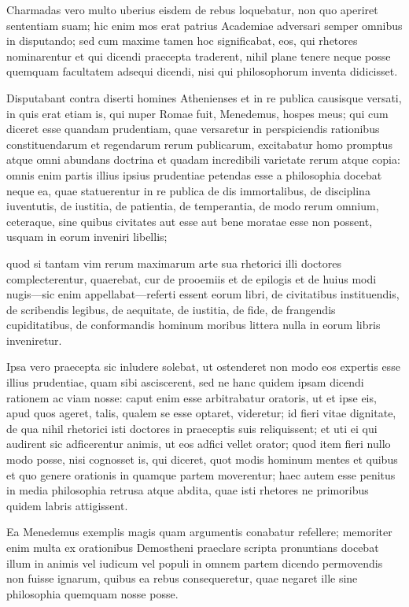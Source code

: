  Charmadas vero multo uberius eisdem de rebus loquebatur, non quo aperiret sententiam suam; hic enim mos erat patrius Academiae adversari semper omnibus in disputando; sed cum maxime tamen hoc significabat, eos, qui rhetores nominarentur et qui dicendi praecepta traderent, nihil plane tenere neque posse quemquam facultatem adsequi dicendi, nisi qui philosophorum inventa didicisset.

 Disputabant contra diserti homines Athenienses et in re publica causisque versati, in quis erat etiam is, qui nuper Romae fuit, Menedemus, hospes meus; qui cum diceret esse quandam prudentiam, quae versaretur in perspiciendis rationibus constituendarum et regendarum rerum publicarum, excitabatur homo promptus atque omni abundans doctrina et quadam incredibili varietate rerum atque copia: omnis enim partis illius ipsius prudentiae petendas esse a philosophia docebat neque ea, quae statuerentur in re publica de dis immortalibus, de disciplina iuventutis, de iustitia, de patientia, de temperantia, de modo rerum omnium, ceteraque, sine quibus civitates aut esse aut bene moratae esse non possent, usquam in eorum inveniri libellis;

 quod si tantam vim rerum maximarum arte sua rhetorici illi doctores complecterentur, quaerebat, cur de prooemiis et de epilogis et de huius modi nugis—sic enim appellabat—referti essent eorum libri, de civitatibus instituendis, de scribendis legibus, de aequitate, de iustitia, de fide, de frangendis cupiditatibus, de conformandis hominum moribus littera nulla in eorum libris inveniretur.

 Ipsa vero praecepta sic inludere solebat, ut ostenderet non modo eos expertis esse illius prudentiae, quam sibi asciscerent, sed ne hanc quidem ipsam dicendi rationem ac viam nosse: caput enim esse arbitrabatur oratoris, ut et ipse eis, apud quos ageret, talis, qualem se esse optaret, videretur; id fieri vitae dignitate, de qua nihil rhetorici isti doctores in praeceptis suis reliquissent; et uti ei qui audirent sic adficerentur animis, ut eos adfici vellet orator; quod item fieri nullo modo posse, nisi cognosset is, qui diceret, quot modis hominum mentes et quibus et quo genere orationis in quamque partem moverentur; haec autem esse penitus in media philosophia retrusa atque abdita, quae isti rhetores ne primoribus quidem labris attigissent.

 Ea Menedemus exemplis magis quam argumentis conabatur refellere; memoriter enim multa ex orationibus Demostheni praeclare scripta pronuntians docebat illum in animis vel iudicum vel populi in omnem partem dicendo permovendis non fuisse ignarum, quibus ea rebus consequeretur, quae negaret ille sine philosophia quemquam nosse posse.

